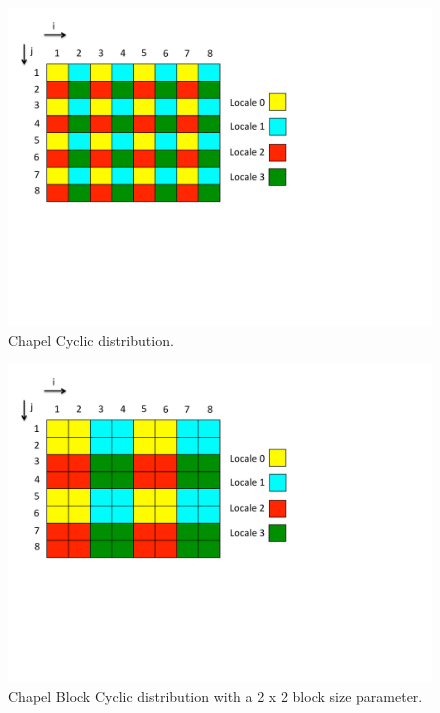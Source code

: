 \begin{figure}
\begin{center}
\includegraphics[width=\linewidth]{./Figures/cyc_dist}
\caption{Chapel Cyclic distribution.}
\label{cyc_dist}
\end{center}
\end{figure}

\begin{figure}
\begin{center}
\includegraphics[width=\linewidth]{./Figures/block_cyc_dist}
\caption{Chapel Block Cyclic distribution with a 2 x 2 block size parameter.}
\label{block_cyc_dist}
\end{center}
\end{figure}

